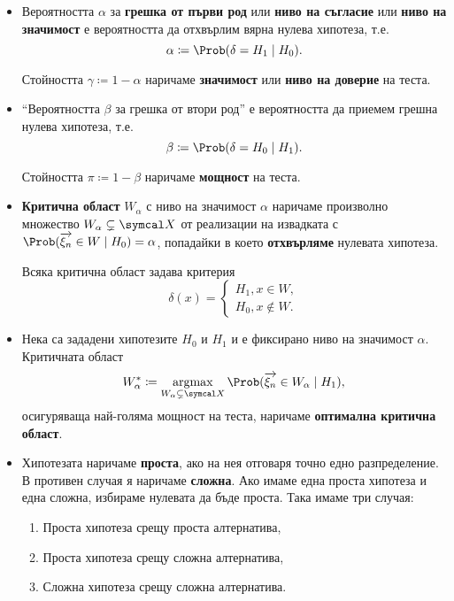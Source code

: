 \documentclass[
  headings=standardclasses,
  bibliography=totocnumbered,
]{scrartcl}
\begin{document}
\begin{definition}[Хипотези]
\begin{itemize}
    \item Вероятността \( \alpha \) за \textbf{грешка от първи род} или \textbf{ниво на съгласие} или \textbf{ниво на значимост} е вероятността да отхвърлим вярна нулева хипотеза, т.е.
    \begin{equation*}
      \alpha \coloneqq \Prob(\delta = H_1 \mid H_0).
    \end{equation*}

    Стойността \( \gamma \coloneqq 1 - \alpha \) наричаме \textbf{значимост} или \textbf{ниво на доверие} на теста.

    \item \enquote{Вероятността \( \beta \) за грешка от втори род} е вероятността да приемем грешна нулева хипотеза, т.е.
    \begin{equation*}
      \beta \coloneqq \Prob(\delta = H_0 \mid H_1).
    \end{equation*}

    Стойността \( \pi \coloneqq 1 - \beta \) наричаме \textbf{мощност} на теста.

    \item \textbf{Критична област} \( W_\alpha \) с ниво на значимост \( \alpha \) наричаме произволно множество \( W_\alpha \subsetneq \SampleSpace \) от реализации на извадката с \( \Prob(\V{\xi_n} \in W \mid H_0) = \alpha \), попадайки в което \textbf{отхвърляме} нулевата хипотеза.

    Всяка критична област задава критерия
    \begin{equation*}
      \delta(x) = \begin{cases}
        H_1, x \in W, \\
        H_0, x \not\in W.
      \end{cases}
    \end{equation*}

    \item Нека са зададени хипотезите \( H_0 \) и \( H_1 \) и е фиксирано ниво на значимост \( \alpha \). Критичната област
    \begin{equation*}
      W_\alpha^* \coloneqq \Argmax_{W_\alpha \subsetneq \SampleSpace} \Prob(\V{\xi_n} \in W_\alpha \mid H_1),
    \end{equation*}
    осигуряваща най-голяма мощност на теста, наричаме \textbf{оптимална критична област}.

    \item Хипотезата наричаме \textbf{проста}, ако на нея отговаря точно едно разпределение. В противен случая я наричаме \textbf{сложна}. Ако имаме една проста хипотеза и една сложна, избираме нулевата да бъде проста. Така имаме три случая:
    \begin{enumerate}
      \item Проста хипотеза срещу проста алтернатива,
      \item Проста хипотеза срещу сложна алтернатива,
      \item Сложна хипотеза срещу сложна алтернатива.
    \end{enumerate}


\end{itemize}
\end{definition}
\end{document}

